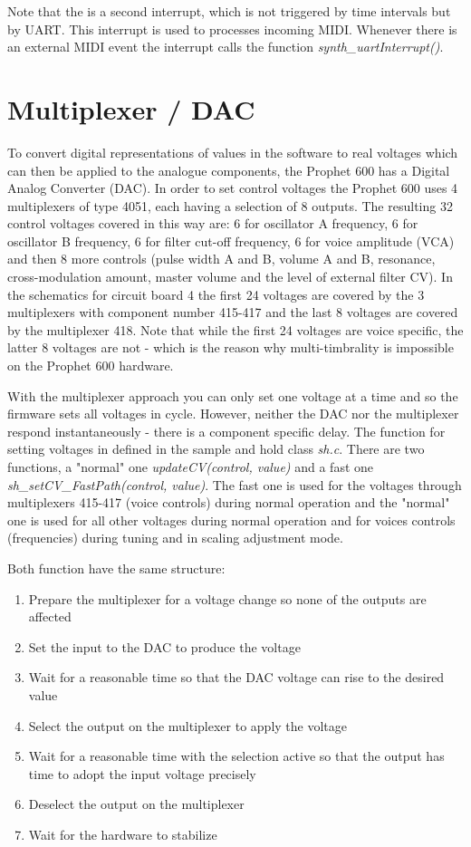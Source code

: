 \documentclass[portrait, 11pt, oneside]{report}
\begin{document}
Note that the is a second interrupt, which is not triggered by time intervals but by UART. This interrupt is used to processes incoming MIDI. Whenever there is an external MIDI event the interrupt calls the function \textit{synth\_uartInterrupt()}.

\section{Multiplexer / DAC}\label{potmux}

To convert digital representations of values in the software to real voltages which can then be applied to the analogue components, the Prophet 600 has a Digital Analog Converter (DAC). In order to set  control voltages the Prophet 600 uses 4 multiplexers of type 4051, each having a selection of 8 outputs. The resulting 32 control voltages covered in this way are: 6 for oscillator A frequency, 6 for oscillator B frequency,  6 for filter cut-off frequency, 6 for voice amplitude (VCA) and then 8 more controls (pulse width A and B, volume A and B, resonance, cross-modulation amount, master volume and the level of external filter CV). In the schematics for circuit board 4 the first 24 voltages are covered by the 3 multiplexers with component number 415-417 and the last 8 voltages are covered by the multiplexer 418. Note that while the first 24 voltages are voice specific, the latter 8 voltages are not - which is the reason why multi-timbrality is impossible on the Prophet 600 hardware.

With the multiplexer approach you can only set one voltage at a time and so the firmware sets all voltages in cycle. However, neither the DAC nor the multiplexer respond instantaneously - there is a component specific delay. The function for setting voltages in defined in the sample and hold class \textit{sh.c}. There are two functions, a "normal" one \textit{updateCV(control, value)} and a fast one \textit{sh\_setCV\_FastPath(control, value)}. The fast one is used for the voltages through multiplexers 415-417 (voice controls) during normal operation and the "normal" one is used for all other voltages during normal operation and for voices controls (frequencies) during tuning and in scaling adjustment mode.

Both function have the same structure:

\begin{enumerate}
  \item Prepare the multiplexer for a voltage change so none of the outputs are affected
  \item Set the input to the DAC to produce the voltage
  \item Wait for a reasonable time so that the DAC voltage can rise to the desired value  
  \item Select the output on the multiplexer to apply the voltage
  \item Wait for a reasonable time with the selection active so that the output has time to adopt the input voltage precisely
  \item Deselect the output on the multiplexer 
  \item Wait for the hardware to stabilize 
\end{enumerate} 
\end{document}
